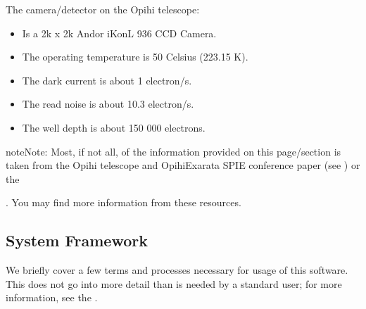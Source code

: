 \documentclass[letterpaper,11pt,english]{sphinxmanual}
\begin{document}
\sphinxAtStartPar
The camera/detector on the Opihi telescope:
\begin{itemize}
\item {} 
\sphinxAtStartPar
Is a 2k x 2k Andor iKon\sphinxhyphen{}L 936 CCD Camera.

\item {} 
\sphinxAtStartPar
The operating temperature is \sphinxhyphen{}50 Celsius (223.15 K).

\item {} 
\sphinxAtStartPar
The dark current is about 1 electron/s.

\item {} 
\sphinxAtStartPar
The read noise is about 10.3 electron/s.

\item {} 
\sphinxAtStartPar
The well depth is about 150 000 electrons.

\end{itemize}

\begin{sphinxadmonition}{note}{Note:}
\sphinxAtStartPar
Most, if not all, of the information provided on this page/section is
taken from the Opihi telescope and OpihiExarata SPIE conference paper (see
{\hyperref[\detokenize{user/citations:user-citations}]{}}) or the %
\begin{footnote}[3]\sphinxAtStartFootnote
{}
%
\end{footnote}. You may find more
information from these resources.
\end{sphinxadmonition}

\sphinxstepscope


\subsection{System Framework}
\label{\detokenize{user/system_framework:system-framework}}\label{\detokenize{user/system_framework:user-system-framework}}\label{\detokenize{user/system_framework::doc}}
\sphinxAtStartPar
We briefly cover a few terms and processes necessary for usage of this
software. This does not go into more detail than is needed by a standard user;
for more information, see the {\hyperref[\detokenize{technical/index:technical-index}]{}}.
\end{document}
